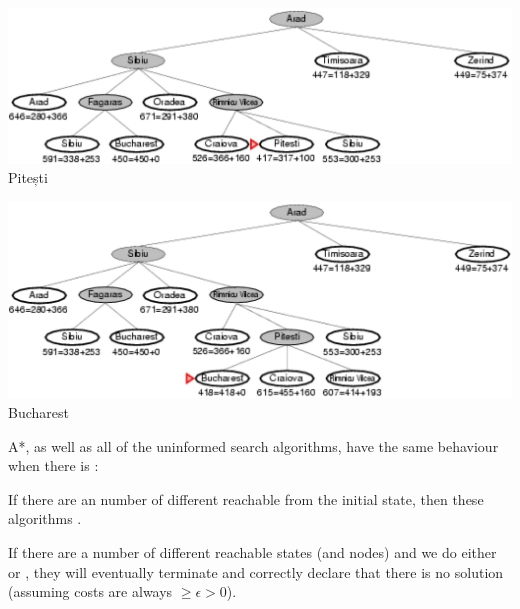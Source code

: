 \begin{example}
    {~~~}

    {~~~}

    \begin{minipage}[t]{0.45\linewidth} \begin{center} \includegraphics[width=\linewidth]{figures/a-star-search/5.png} Pitești \end{center} \end{minipage}
    \hfill%
    \begin{minipage}[t]{0.45\linewidth} \begin{center} \includegraphics[width=\linewidth]{figures/a-star-search/6.png} Bucharest \end{center} \end{minipage}
\end{example}

\begin{remark}
    A*, as well as all of the uninformed search algorithms, have the same behaviour when there is :

    \begin{listu}
        \item If there are an  number of different  reachable from the initial state, then these algorithms .
        \item If there are a  number of different reachable states (and nodes) and we do either  or , they will eventually terminate and correctly declare that there is no solution (assuming costs are always $\ge \epsilon > 0$).
    \end{listu}
\end{remark}

